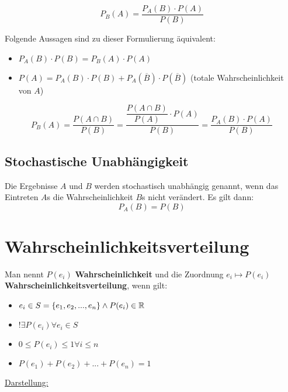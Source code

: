\documentclass[main.tex]{subfiles}
\begin{document}
\begin{Theorem}
  $$P_B(A)=\dfrac{P_A(B)\cdot P(A)}{P(B)}$$
\end{Theorem}

\begin{Bemerkung}
  Folgende Aussagen sind zu dieser Formulierung äquivalent:
  \begin{itemize}
    \item $P_A(B)\cdot P(B) = P_B(A)\cdot P(A)$
    \item $P(A) = P_A(B) \cdot P(B) + P_A(\overline B) \cdot P(\overline B)$ (totale Wahrscheinlichkeit von $A$)
  \end{itemize}
\end{Bemerkung}

\begin{Beweis}
  $$P_B(A) = \dfrac{P(A\cap B)}{P(B)} = \dfrac{\dfrac{P(A\cap B)}{P(A)}\cdot P(A)}{P(B)} = \dfrac{P_A(B)\cdot P(A)}{P(B)}$$
\end{Beweis}

\subsection{Stochastische Unabhängigkeit}
\begin{Definition}
  Die Ergebnisse $A$ und $B$ werden stochastisch unabhängig genannt, wenn das Eintreten $A$s die Wahrscheinlichkeit $B$s nicht verändert. Es gilt dann:
  $$P_A(B)=P(B)$$
\end{Definition}



\section{Wahrscheinlichkeitsverteilung}
\begin{Definition}
  Man nennt $P(e_i)$ \textbf{Wahrscheinlichkeit} und die Zuordnung $e_i \longmapsto P(e_i)$ \textbf{Wahrscheinlichkeitsverteilung}, wenn gilt:
  \begin{itemize}
    \item $e_i \in S=\{ e_1,e_2,...,e_n\} \land P(e_i)\in \mathbb{R}$
    \item $!\exists P(e_i) \forall e_i \in S$
    \item $0 \leq P(e_i)\leq 1 \forall i \leq n$
    \item $P(e_1)+P(e_2)+...+P(e_n)=1$
  \end{itemize}
\end{Definition}

\underline{Darstellung:}
\end{document}
